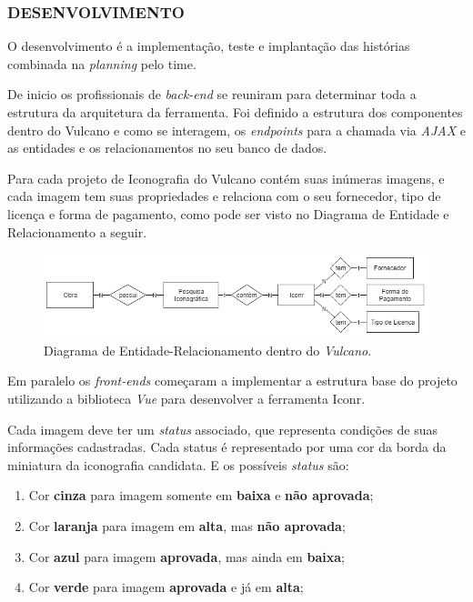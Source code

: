 \documentclass[
  12pt,				%
  openany,
  oneside,
  a4paper,			%
  english,			%
  brazil
]{article}
\numberwithin{figure}{section}
\numberwithin{table}{section}
\begin{document}
\subsubsection{DESENVOLVIMENTO}

O desenvolvimento é a implementação, teste e implantação das histórias combinada na \textit{planning} pelo time.

De inicio os profissionais de \textit{back-end} se reuniram para determinar toda a estrutura da arquitetura da ferramenta. Foi definido a estrutura dos componentes dentro do Vulcano e como se interagem, os \textit{endpoints} para a chamada via \textit{AJAX} e as entidades e os relacionamentos no seu banco de dados.

Para cada projeto de Iconografia do Vulcano contém suas inúmeras imagens, e cada imagem tem suas propriedades e relaciona com o seu fornecedor, tipo de licença e forma de pagamento, como pode ser visto no Diagrama de Entidade e Relacionamento a seguir.

\begin{figure}[H]
	\centering
	\includegraphics[width=\linewidth]{iconr_der}
	\vspace{-10mm}
	\caption{Diagrama de Entidade-Relacionamento dentro do \textit{Vulcano}.}
	\label{fig:iconr:der}
\end{figure}

Em paralelo os \textit{front-ends} começaram a implementar a estrutura base do projeto utilizando a biblioteca \textit{Vue} para desenvolver a ferramenta Iconr. 

Cada imagem deve ter um \textit{status} associado, que representa condições de suas informações cadastradas. Cada status é representado por uma cor da borda da miniatura da iconografia candidata. E os possíveis \textit{status} são:

\vspace{-10mm}
\begin{singlespace}
	\begin{enumerate}
		\item Cor \textbf{cinza} para imagem somente em \textbf{baixa} e \textbf{não aprovada};
		\item Cor \textbf{laranja} para imagem em \textbf{alta}, mas \textbf{não aprovada};
		\item Cor \textbf{azul} para imagem \textbf{aprovada}, mas ainda em \textbf{baixa};
		\item Cor \textbf{verde} para imagem \textbf{aprovada} e já em \textbf{alta};
	\end{enumerate}
\end{singlespace}
\vspace{-5mm}
\end{document}
